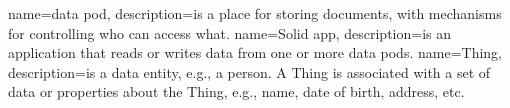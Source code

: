 {
  name=data pod,
  description={is a place for storing documents, with mechanisms for controlling who can access what.}
}
{
  name=Solid app,
  description={is an application that reads or writes data from one or more data pods.}
}
{
  name=Thing,
  description={is a data entity, e.g., a person. A Thing is associated with a set of data or properties about the Thing, e.g., name, date of birth, address, etc.}
}